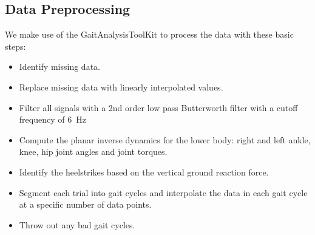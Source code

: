 \documentclass{article}
\begin{document}

\subsection{Data Preprocessing}
%
We make use of the GaitAnalysisToolKit to process the data with these basic
steps:

\begin{itemize}
  \item Identify missing data.
  \item Replace missing data with linearly interpolated values.
  \item Filter all signals with a 2nd order low pass Butterworth filter with a
    cutoff frequency of 6~\si{\hertz}
  \item Compute the planar inverse dynamics for the lower body: right and left
    ankle, knee, hip joint angles and joint torques.
  \item Identify the heelstrikes based on the vertical ground reaction force.
  \item Segment each trial into gait cycles and interpolate the data in each
    gait cycle at a specific number of data points.
  \item Throw out any bad gait cycles.
\end{itemize}

\end{document}
